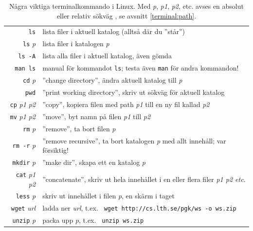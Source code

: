 \begin{table}[H]
\renewcommand{\arraystretch}{1.25}
   
\begin{tabular}{@{}r | l}
\texttt{ls} & lista filer i aktuell katalog (alltså där du ''står'')\\
\texttt{ls} \textit{p}  & lista filer i katalogen  \textit{p} \\
\texttt{ls -A} & lista alla filer i aktuell katalog, även gömda \\
\texttt{man ls} & manual för kommandot \texttt{ls}; testa även \texttt{man} för andra kommandon! \\
\texttt{cd} \textit{p} & ''change directory'', ändra aktuell katalog till \textit{p}\\
\texttt{pwd} & ''print working directory'', skriv ut sökväg för aktuell katalog \\
\texttt{cp} \textit{p1 p2} & ''copy'', kopiera filen med path \textit{p1} till en ny fil kallad \textit{p2} \\
\texttt{mv} \textit{p1 p2} & ''move'', byt namn på filen \textit{p1} till \textit{p2}  \\
\texttt{rm} \textit{p} & ''remove'', ta bort filen \textit{p}\\
\texttt{rm -r} \textit{p} & ''remove recursive'', ta bort katalogen \textit{p} med allt innehåll; var försiktig!\\
\texttt{mkdir} \textit{p} & ''make dir'', skapa ett en katalog \textit{p}\\
\texttt{cat} \textit{p1 p2}& ''concatenate'', skriv ut hela innehållet i en eller flera filer \textit{p1 p2 etc.}\\
\texttt{less} \textit{p}& skriv ut innehållet i filen \textit{p}, en skärm i taget\\
\texttt{wget} \textit{url}&ladda ner \textit{url}, t.ex. \texttt{ wget http://cs.lth.se/pgk/ws -o ws.zip}\\
\texttt{unzip} \textit{p}& packa upp \textit{p}, t.ex. \texttt{ unzip ws.zip}\\
\end{tabular}

    \caption{Några viktiga terminalkommando i Linux. Med \textit{p}, \textit{p1}, \textit{p2}, etc.  avses en absolut eller relativ sökväg , se avsnitt \ref{terminal:path}.}
    \label{fig:terminal:commands}

\end{table}

